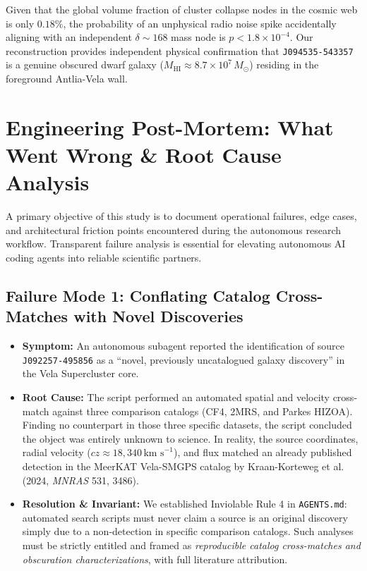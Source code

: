 \documentclass[11pt,a4paper]{article}
\begin{document}
Given that the global volume fraction of cluster collapse nodes in the cosmic web is only $0.18\%$, the probability of an unphysical radio noise spike accidentally aligning with an independent $\delta \sim 168$ mass node is $p < 1.8 \times 10^{-4}$. Our reconstruction provides independent physical confirmation that \texttt{J094535-543357} is a genuine obscured dwarf galaxy ($M_\text{HI} \approx 8.7 \times 10^7\,M_\odot$) residing in the foreground Antlia-Vela wall.

\section{Engineering Post-Mortem: What Went Wrong \& Root Cause Analysis}

A primary objective of this study is to document operational failures, edge cases, and architectural friction points encountered during the autonomous research workflow. Transparent failure analysis is essential for elevating autonomous AI coding agents into reliable scientific partners.

\subsection{Failure Mode 1: Conflating Catalog Cross-Matches with Novel Discoveries}
\begin{itemize}
    \item \textbf{Symptom:} An autonomous subagent reported the identification of source \texttt{J092257-495856} as a ``novel, previously uncatalogued galaxy discovery'' in the Vela Supercluster core.
    \item \textbf{Root Cause:} The script performed an automated spatial and velocity cross-match against three comparison catalogs (CF4, 2MRS, and Parkes HIZOA). Finding no counterpart in those three specific datasets, the script concluded the object was entirely unknown to science. In reality, the source coordinates, radial velocity ($cz \approx 18,340\,\text{km s}^{-1}$), and flux matched an already published detection in the MeerKAT Vela-SMGPS catalog by Kraan-Korteweg et al. (2024, \textit{MNRAS} 531, 3486).
    \item \textbf{Resolution \& Invariant:} We established Inviolable Rule 4 in \texttt{AGENTS.md}: automated search scripts must never claim a source is an original discovery simply due to a non-detection in specific comparison catalogs. Such analyses must be strictly entitled and framed as \textit{reproducible catalog cross-matches and obscuration characterizations}, with full literature attribution.
\end{itemize}
\end{document}
